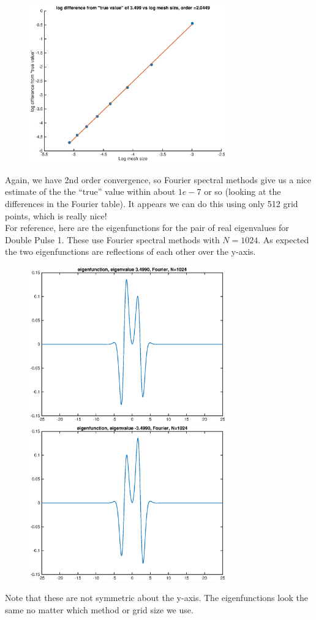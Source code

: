 \documentclass[12pt]{article}
\begin{document}
\begin{figure}[H]
\includegraphics[width=8.5cm]{1double1fdeigtrue}
\end{figure}

Again, we have 2nd order convergence, so Fourier spectral methods give us a nice estimate of the the ``true'' value within about $1e-7$ or so (looking at the differences in the Fourier table). It appears we can do this using only 512 grid points, which is really nice!\\

For reference, here are the eigenfunctions for the pair of real eigenvalues for Double Pulse 1. These use Fourier spectral methods with $N = 1024$. As expected the two eigenfunctions are reflections of each other over the y-axis.
\begin{figure}[H]
\includegraphics[width=8.5cm]{1double1fouriereigenfnplus}
\includegraphics[width=8.5cm]{1double1fouriereigenfnminus}
\end{figure}
Note that these are not symmetric about the y-axis. The eigenfunctions look the same no matter which method or grid size we use.\\
\end{document}
